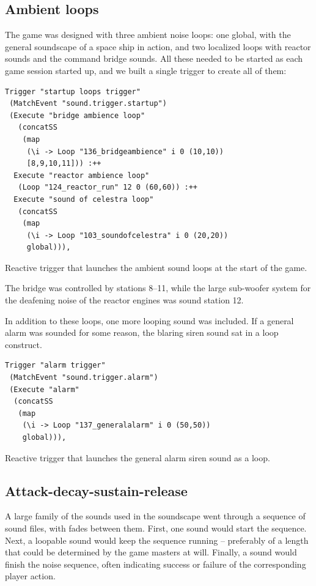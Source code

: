 \subsection{Ambient loops}
\label{sec:ambient-loops}

The game was designed with three ambient noise loops: one global, with the general soundscape of a space ship in action, and two localized loops with reactor sounds and the command bridge sounds. All these needed to be started as each game session started up, and we built a single trigger to create all of them:

\begin{listing}
\begin{verbatim}
Trigger "startup loops trigger" 
 (MatchEvent "sound.trigger.startup") 
 (Execute "bridge ambience loop" 
   (concatSS 
    (map 
     (\i -> Loop "136_bridgeambience" i 0 (10,10)) 
     [8,9,10,11])) :++
  Execute "reactor ambience loop" 
   (Loop "124_reactor_run" 12 0 (60,60)) :++
  Execute "sound of celestra loop" 
   (concatSS  
    (map 
     (\i -> Loop "103_soundofcelestra" i 0 (20,20)) 
     global))),
\end{verbatim}
\caption{Reactive trigger that launches the ambient sound loops at the
start of the game.}
\end{listing}

The bridge was controlled by stations 8--11, while the large sub-woofer system for the deafening noise of the reactor engines was sound station 12. 

In addition to these loops, one more looping sound was included. If a general alarm was sounded for some reason, the blaring siren sound sat in a loop construct.

\begin{listing}
\begin{verbatim}
Trigger "alarm trigger" 
 (MatchEvent "sound.trigger.alarm") 
 (Execute "alarm" 
  (concatSS 
   (map 
    (\i -> Loop "137_generalalarm" i 0 (50,50)) 
    global))),
\end{verbatim}
\caption{Reactive trigger that launches the general alarm siren sound
  as a loop.}
\end{listing}

\subsection{Attack-decay-sustain-release}
\label{sec:attack-decay-sustain}

A large family of the sounds used in the soundscape went through a sequence of sound files, with fades between them. First, one sound would start the sequence. Next, a loopable sound would keep the sequence running -- preferably of a length that could be determined by the game masters at will. Finally, a sound would finish the noise sequence, often indicating success or failure of the corresponding player action.

